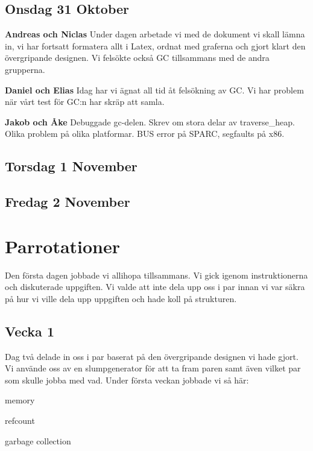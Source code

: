 \documentclass{article}
\begin{document}
\subsection{Onsdag 31 Oktober}
{\bf Andreas och Niclas}
Under dagen arbetade vi med de dokument vi skall lämna in, vi har fortsatt formatera allt i Latex, ordnat med graferna och gjort klart den övergripande designen. Vi felsökte också GC tillsammans med de andra grupperna.

{\bf Daniel och Elias}
Idag har vi ägnat all tid åt felsökning av GC. Vi har problem när vårt test för GC:n har skräp att samla.

{\bf Jakob och Åke}
Debuggade gc-delen. Skrev om stora delar av traverse\_heap. Olika problem på olika platformar. BUS error på SPARC, segfaults på x86.

\subsection{Torsdag 1 November}
\subsection{Fredag 2 November}


\section{Parrotationer}

Den första dagen jobbade vi allihopa tillsammans. Vi gick igenom instruktionerna och diskuterade uppgiften. Vi valde att inte dela upp oss i par innan vi var säkra på hur vi ville dela upp uppgiften och hade koll på strukturen.

\subsection{Vecka 1}
Dag två delade in oss i par baserat på den övergripande designen vi hade gjort. Vi använde oss av en slumpgenerator för att ta fram paren samt även vilket par som skulle jobba med vad. Under första veckan jobbade vi så här:

\begin{description} \parskip0pt
  \item[Niclas och Åke] memory
  \item[Elias och Jakob] refcount
  \item[Andreas och Daniel] garbage collection
\end{description}
\end{document}
